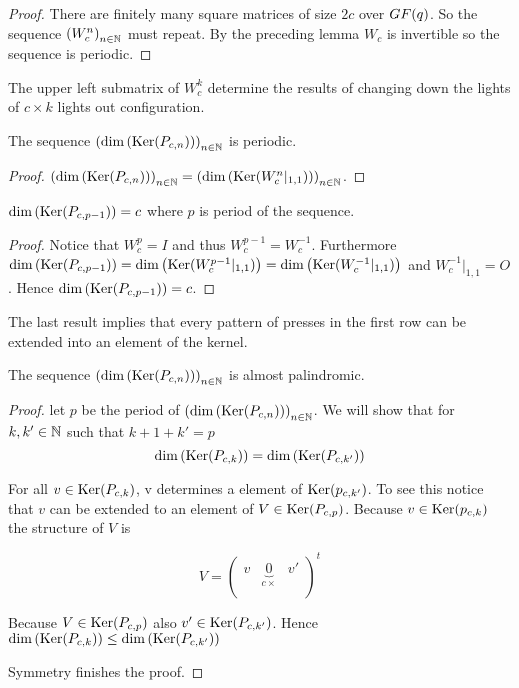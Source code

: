 \begin{proof}
  There are finitely many square matrices of size $2c$ over
  $GF(q)$. So the sequence $\left(W_{c}^{n}\right)_{n\in\mathbb{N}}$ must
  repeat. By the preceding lemma $W_{c}$ is invertible so the
  sequence is periodic.
\end{proof}

The upper left submatrix of $W_{c}^{k}$ determine the results of
changing down the lights of $c \times k$ lights out configuration.

\begin{corollary}
  The sequence $\left(\dim\left(\operatorname{Ker}(P_{c,n})\right)\right)_{n\in\mathbb{N}}$
  is periodic.
\end{corollary}

\begin{proof}
  $\left(\dim\left(\operatorname{Ker}(P_{c,n})\right)\right)_{n\in\mathbb{N}} = \left(\dim\left(\operatorname{Ker}(W_{c}^{n}|_{1,1})\right)\right)_{n\in\mathbb{N}}$.
\end{proof}

\begin{lemma}
  $\dim\left(\operatorname{Ker}(P_{c,p-1})\right) = c$ where $p$ is period of the sequence. 
\end{lemma}

\begin{proof}
  Notice that $W_{c}^{p} = I$ and thus $W_{c}^{p-1} =  W_{c}^{-1}$.
  Furthermore $\dim\left(\operatorname{Ker}(P_{c,p-1})\right) =
  \dim\left(\operatorname{Ker}(W_{c}^{p-1}|_{1,1})\right) =
  \dim\left(\operatorname{Ker}(W_{c}^{-1}|_{1,1})\right)$ and $W_{c}^{-1}|_{1,1} = O$. 
  Hence $\dim\left(\operatorname{Ker}(P_{c,p-1})\right) = c$.
\end{proof}

The last result implies that every pattern of presses in the first row
can be extended into an element of the kernel.

\begin{theorem}
  The sequence $\left(\dim\left(\operatorname{Ker}(P_{c,n})\right)\right)_{n\in\mathbb{N}}$
  is almost palindromic.
\end{theorem}

\begin{proof}
  let $p$ be the period of
  $\left(\dim\left(\operatorname{Ker}(P_{c,n})\right)\right)_{n\in\mathbb{N}}$. We will show
  that for $k,k'\in\mathbb{N}$ such that $k+1+k'=p$
  \[
  \dim\left(\operatorname{Ker}(P_{c,k})\right) = \dim\left(\operatorname{Ker}(P_{c,k'})\right)
  \]

  For all $v\in\operatorname{Ker}(P_{c,k})$, v determines a element of
  $\operatorname{Ker}(p_{c,k'})$. To see this notice that $v$ can be extended to an
  element of $V\in\operatorname{Ker}(P_{c,p})$. Because $v\in\operatorname{Ker}(p_{c,k})$ the
  structure of $V$ is
  
  \[
  V =
  \left(
  \begin{array}{ccc}
    v & \underbrace{0}_{c\times} & v' \\
  \end{array}
  \right)^{t}
  \]
  
  Because $V\in\operatorname{Ker}(P_{c,p})$ also
  $v'\in\operatorname{Ker}(P_{c,k'})$. Hence  $\dim\left(\operatorname{Ker}(P_{c,k})\right) \le
  \dim\left(\operatorname{Ker}(P_{c,k'})\right)$ 

  Symmetry finishes the proof.
\end{proof}
